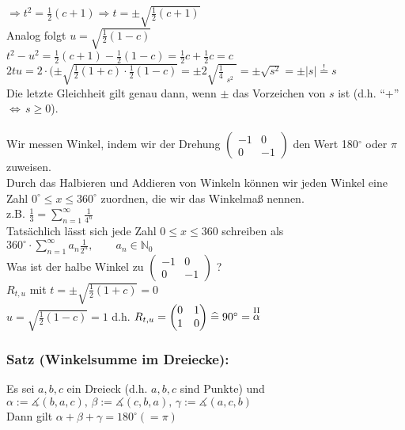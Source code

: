 $\Rightarrow t^{2} = \frac{1}{2}(c+1) \Rightarrow t = \pm \sqrt{\frac{1}{2}(c+1)}$\\
Analog folgt $u=\sqrt{\frac{1}{2}(1-c)}$ \\
$t^{2}-u^{2} = \frac{1}{2}(c+1)-\frac{1}{2}(1-c)=\frac{1}{2}c + \frac{1}{2}c = c$\\
$2tu=2\cdot(\pm\sqrt{\frac{1}{2}(1+c)\cdot\frac{1}{2}(1-c)} = \pm 2 \sqrt{\frac{1}{4}\mathop{\underbrace{(1-c^{2})}}\limits_{s^{2}}} = \pm \sqrt{s^{2}} = \pm \vert s \vert \mathop{=}\limits^{\text{!}} s$\\
Die letzte Gleichheit gilt genau dann, wenn $\pm$ das Vorzeichen von $s$ ist (d.h. "`+"' $\Leftrightarrow \, s \geq 0$).\\
\qquad\\
Wir messen Winkel, indem wir der Drehung $\begin{pmatrix} -1 & 0 \\ 0 & -1 \end{pmatrix}$ den Wert 180$^{\circ}$ oder $\pi$ zuweisen.\\
Durch das Halbieren und Addieren von Winkeln können wir jeden Winkel eine Zahl $0^{\circ} \leq x \leq 360^{\circ}$ zuordnen, die wir das Winkelmaß nennen. \\
z.B. $\frac{1}{3} = \sum\limits^{\infty}_{n=1} \frac{1}{4^{n}}$\\
Tatsächlich lässt sich jede Zahl $ 0 \leq x \leq 360 $ schreiben als $360^{\circ} \cdot  \sum\limits^{\infty}_{n=1}a_{n}\frac{1}{2^{n}}, \qquad a_{n}\in  \mathbb{N}_{0}$ \\
Was ist der halbe Winkel zu $\begin{pmatrix} -1 & 0 \\ 0 & -1 \end{pmatrix}$ ?\\
$R_{t,u}$ mit $t = \pm \sqrt{\frac{1}{2}(1+c)} = 0$\\
$ u = \sqrt{\frac{1}{2}(1-c)} = 1$ d.h. $R_{t,u} = \begin{pmatrix} 0 & 1 \\ 1 & 0 \end{pmatrix} \mathrel{\widehat{=}} 90^{\circ} = \mathop{\alpha}\limits^{\text{\RM{2}}}$
%
%
%
\subsubsection{Satz (Winkelsumme im Dreiecke):}
Es sei $a,b,c$ ein Dreieck (d.h. $a,b,c$ sind Punkte) und $\alpha := \measuredangle ( b,a,c), \, \beta := \measuredangle(c,b,a), \, \gamma := \measuredangle (a,c,b)$\\
Dann gilt $\alpha + \beta + \gamma = 180^{\circ} (=\pi)$
%
%
%
